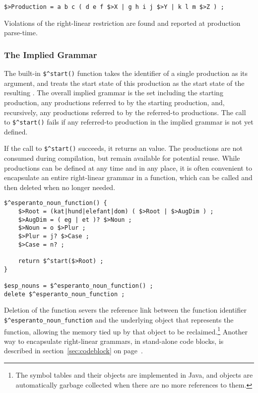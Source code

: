 \begin{Verbatim}
$>Production = a b c ( d e f $>X | g h i j $>Y | k l m $>Z ) ;
\end{Verbatim}

\noindent
Violations of the right-linear restriction are found and reported
at production parse-time.

\subsubsection{The Implied Grammar}

The built-in \verb!$^start()! function takes the identifier of a single
production as its argument, and treats the start state of this production as the
start state of the resulting \fsm{}.  The overall implied grammar is the set
including the
starting production, any productions referred to by the starting
production, and, 
recursively, any productions referred to by the referred-to productions.
The call to \verb!$^start()! fails if any referred-to production in the
implied grammar is
not yet defined.

If the call to \verb!$^start()! succeeds, it returns an \fsm{} value.  The
productions are not consumed during compilation, but remain available for
potential reuse.  While productions can be defined at any time and in any
place, it is often convenient to encapsulate an entire right-linear grammar
in a function, which can be called and then deleted when no longer
needed.

\begin{Verbatim}
$^esperanto_noun_function() {
	$>Root = (kat|hund|elefant|dom) ( $>Root | $>AugDim ) ;
	$>AugDim = ( eg | et )? $>Noun ;
	$>Noun = o $>Plur ;
	$>Plur = j? $>Case ;
	$>Case = n? ;

	return $^start($>Root) ;
}

$esp_nouns = $^esperanto_noun_function() ;
delete $^esperanto_noun_function ;
\end{Verbatim}

Deletion of the function severs the reference link between the function
identifier \verb!$^esperanto_noun_function! and the underlying object that
represents the function, allowing the memory tied up by that object to be
reclaimed.\footnote{The symbol tables and their objects are implemented in
Java, and objects are automatically garbage collected when there are no
more references to them.}  Another way to encapsulate right-linear
grammars, in stand-alone code blocks, is described in
section~\ref{sec:codeblock} on page~\pageref{sec:codeblock}.

